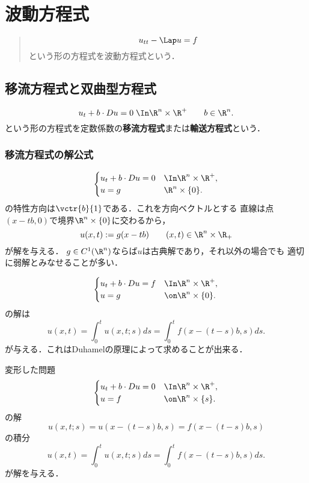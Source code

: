 \documentclass[uplatex,dvipdfmx]{jsreport}
\begin{document}
\chapter{波動方程式}

\begin{quotation}
    \[u_{tt}-\Lap u=f\]
    という形の方程式を波動方程式という．
\end{quotation}

\section{移流方程式と双曲型方程式}

\begin{definition}
    \[u_t+b\cdot Du=0\;\In\R^n\times\R^+\qquad b\in\R^n.\]
    という形の方程式を定数係数の\textbf{移流方程式}または\textbf{輸送方程式}という．
\end{definition}

\subsection{移流方程式の解公式}

\begin{observation}[斉次な場合]\label{observation-homogeneous-transport-eq}
    \[\begin{cases}
        u_t+b\cdot Du=0&\In \R^n\times\R^+,\\
        u=g&\R^n\times\{0\}.
    \end{cases}\]
    の特性方向は$\vctr{b}{1}$である．これを方向ベクトルとする
    直線は点$(x-tb,0)$で境界$\R^n\times\{0\}$に交わるから，
    \[u(x,t):=g(x-tb)\qquad(x,t)\in\R^n\times\R_+\]
    が解を与える．
    $g\in C^1(\R^n)$ならば$u$は古典解であり，それ以外の場合でも
    適切に弱解とみなせることが多い．
\end{observation}

\begin{observation}[非斉次な場合]\label{observation-nonhomogeneous-transport-eq}
    \[\begin{cases}
        u_t+b\cdot Du=f&\In \R^n\times\R^+,\\
        u=g&\on\R^n\times\{0\}.
    \end{cases}\]
    の解は
    \[u(x,t)=\int^t_0u(x,t;s)ds=\int^t_0f(x-(t-s)b,s)ds.\]
    が与える．これはDuhamelの原理によって求めることが出来る．
\end{observation}
\begin{Proof}[\bf 解説]
    変形した問題
    \[\begin{cases}
        u_t+b\cdot Du=0&\In\R^n\times\R^+,\\
        u=f&\on\R^n\times\{s\}.
    \end{cases}\]
    の解
    \[u(x,t;s)=u(x-(t-s)b,s)=f(x-(t-s)b,s)\]
    の積分
    \[u(x,t)=\int^t_0u(x,t;s)ds=\int^t_0f(x-(t-s)b,s)ds.\]
    が解を与える．
\end{Proof}
\end{document}
